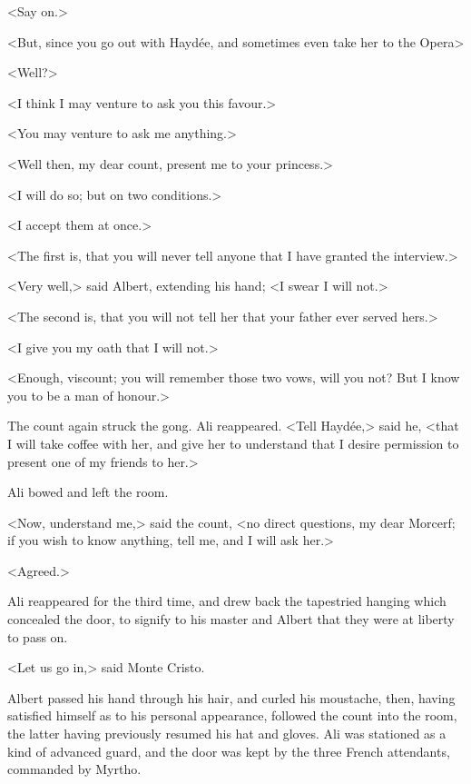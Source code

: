  <Say on.> 

 <But, since you go out with Haydée, and sometimes even take her to the Opera\longdash> 

 <Well?> 

 <I think I may venture to ask you this favour.> 

 <You may venture to ask me anything.> 

 <Well then, my dear count, present me to your princess.> 

 <I will do so; but on two conditions.> 

 <I accept them at once.> 

 <The first is, that you will never tell anyone that I have granted the interview.> 

 <Very well,> said Albert, extending his hand; <I swear I will not.> 

 <The second is, that you will not tell her that your father ever served hers.> 

 <I give you my oath that I will not.> 

 <Enough, viscount; you will remember those two vows, will you not? But I know you to be a man of honour.> 

 The count again struck the gong. Ali reappeared. <Tell Haydée,> said he, <that I will take coffee with her, and give her to understand that I desire permission to present one of my friends to her.> 

 Ali bowed and left the room. 

 <Now, understand me,> said the count, <no direct questions, my dear Morcerf; if you wish to know anything, tell me, and I will ask her.> 

 <Agreed.> 

 Ali reappeared for the third time, and drew back the tapestried hanging which concealed the door, to signify to his master and Albert that they were at liberty to pass on. 

 <Let us go in,> said Monte Cristo. 

 Albert passed his hand through his hair, and curled his moustache, then, having satisfied himself as to his personal appearance, followed the count into the room, the latter having previously resumed his hat and gloves. Ali was stationed as a kind of advanced guard, and the door was kept by the three French attendants, commanded by Myrtho. 

